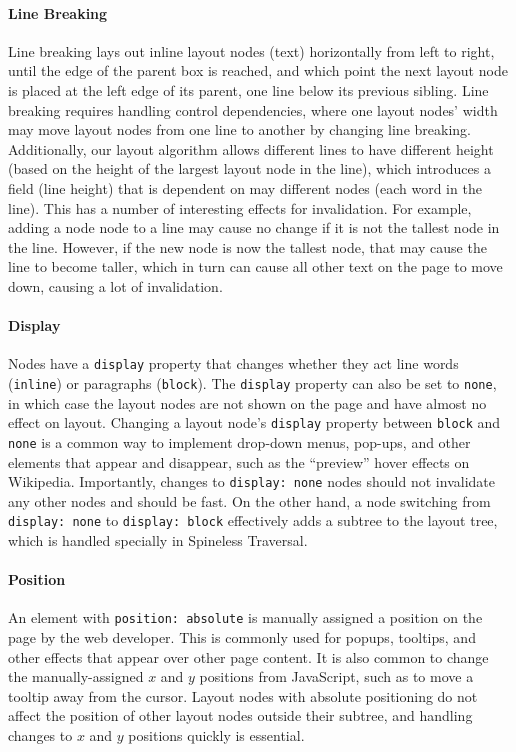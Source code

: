 \paragraph{Line Breaking}
Line breaking lays out inline layout nodes (text)
  horizontally from left to right,
  until the edge of the parent box is reached,
  and which point the next layout node is placed
  at the left edge of its parent,
  one line below its previous sibling.
Line breaking requires handling control dependencies,
  where one layout nodes' width may move layout nodes
  from one line to another by changing line breaking.
Additionally, our layout algorithm
  allows different lines to have different height
  (based on the height of the largest layout node in the line),
  which introduces a field (line height)
  that is dependent on may different nodes (each word in the line).
This has a number of interesting effects for invalidation.
For example, adding a node node to a line
  may cause no change if it is not the tallest node in the line.
However, if the new node is now the tallest node,
  that may cause the line to become taller,
  which in turn can cause all other text on the page to move down,
  causing a lot of invalidation.

\paragraph{Display}
Nodes have a \texttt{display} property that changes
  whether they act line words (\texttt{inline})
  or paragraphs (\texttt{block}).
The \texttt{display} property can also be set to \texttt{none},
  in which case the layout nodes are not shown on the page
  and have almost no effect on layout.
Changing a layout node's \texttt{display} property
  between \texttt{block} and \texttt{none}
  is a common way to implement drop-down menus,
  pop-ups, and other elements that appear and disappear,
  such as the ``preview'' hover effects on Wikipedia.
Importantly,
  changes to \texttt{display: none} nodes
  should not invalidate any other nodes and should be fast.
On the other hand, a node switching
  from \texttt{display: none} to \texttt{display: block}
  effectively adds a subtree to the layout tree,
  which is handled specially in Spineless Traversal.
  
\paragraph{Position}
An element with \texttt{position: absolute}
  is manually assigned a position on the page
  by the web developer.
This is commonly used for popups, tooltips, and other effects
  that appear over other page content.
It is also common
  to change the manually-assigned $x$ and $y$ positions
  from JavaScript, such as to move a tooltip away from the cursor.
Layout nodes with absolute positioning do not affect
  the position of other layout nodes outside their subtree,
  and handling changes to $x$ and $y$ positions quickly
  is essential.

